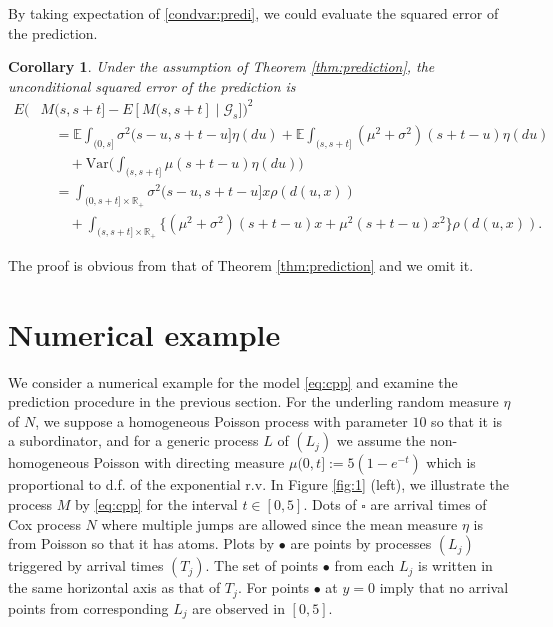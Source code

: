 \documentclass[11pt,leqno%
]{amsart}
\newtheorem{corollary}[lemma]{Corollary}
\newcommand{\R}{\mathbb{R}}
\newcommand{\E }{{\mathbb E}}
\newcommand{\1}{{\mathbf 1}}
\begin{document}
By taking expectation of \eqref{condvar:predi}, we could evaluate the squared
error of the prediction. 
\begin{corollary}
Under the assumption of Theorem \ref{thm:prediction}, the unconditional
 squared error
 of the prediction is 
 \begin{align*}
   E\big( &M(s,s+t]-E[M(s,s+t] \mid \mathcal G_s] \big)^2 \\ 
  &\quad = \E \int_{(0,s]} \sigma^2(s-u,s+t-u] \eta(du) + \E \int_{(s,s+t]}
  (\mu^2+\sigma^2)(s+t-u)\eta(du) \\
  &\qquad + \mathrm{Var}\big( \int_{(s,s+t]}\mu(s+t-u)\eta(du)
 \big) \\
  &\quad = \int_{(0,s+t]\times \R_+} \sigma^2(s-u,s+t-u] x
  \rho(d(u,x)) \\
  &\qquad + \int_{(s,s+t]\times \R_+} \{ (\mu^2+\sigma^2)(s+t-u)x +
  \mu^2(s+t-u)x^2 \} \rho(d(u,x)). 
 \end{align*}
\end{corollary}
The proof is obvious from that of Theorem \ref{thm:prediction} and we
omit it. 

\section{Numerical example}
We consider a numerical example for 
the model \eqref{eq:cpp} and examine the prediction procedure in the
previous section.
For the underling random measure $\eta$ of $N$, we suppose 
a homogeneous Poisson process with parameter $10$ so that it is a
subordinator, and for a generic process $L$ of $(L_j)$ we assume the non-homogeneous
Poisson with directing measure $\mu(0,t]:=5(1-e^{-t})$ which is proportional to
d.f. of the exponential r.v.  
In Figure \ref{fig:1} (left), we illustrate the process $M$ by \eqref{eq:cpp}
for the interval $t\in[0,5]$. Dots of $\square$ are arrival
times of Cox process $N$ where multiple jumps are allowed since the mean
measure $\eta$ is from Poisson so that it has atoms. Plots by $\bullet$ are
points by processes $(L_j)$ triggered by arrival times $(T_j)$. 
The set of points $\bullet$ from each $L_j$ is written in the same
horizontal axis as that of $T_j$. 
For points $\bullet$ at
$y=0$ imply that no arrival points from corresponding
$L_j$ are observed in $[0,5]$. 
\end{document}
